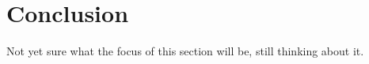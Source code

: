 \begin{figure}[h]
\centering
{}
\caption{}
\label{fig:smallg}       %
\end{figure}



\section{Conclusion}
\label{sec:conclusion}

Not yet sure what the focus of this section will be, still thinking about it. 



\endinput

Any text after an \endinput is ignored.
You could put scraps here or things in progress.
